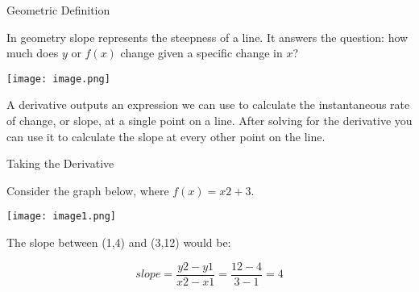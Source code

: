 \documentclass{beamer}
\begin{document}
\begin{frame}{Geometric Definition}
	\begin{flushleft}
		In geometry slope represents the steepness of a line. It answers the question: how much does $y$ or $f(x)$ change given a specific change in $x$?
	\end{flushleft}
   \texttt{[image: image.png]}
   \begin{flushleft}
																																																																																																																																																																																																																																																																																																																																																																																																																																																																															A derivative outputs an expression we can use to calculate the instantaneous rate of change, or slope, at a single point on a line. After solving for the derivative you can use it to calculate the slope at every other point on the line.																
   \end{flushleft}
\end{frame}

\begin{frame}{Taking the Derivative}
\begin{flushleft}
	Consider the graph below, where $f(x)=x2+3$.
\end{flushleft}
	\texttt{[image: image1.png]}
	\begin{flushleft}
		The slope between (1,4) and (3,12) would be: \\
	\end{flushleft}
\vspace{5pt}
\begin{equation*}
	slope = \frac{y2 - y1}{x2 - x1} = \frac{12 - 4}{3 - 1} = 4
\end{equation*}
\end{frame}
\end{document}
